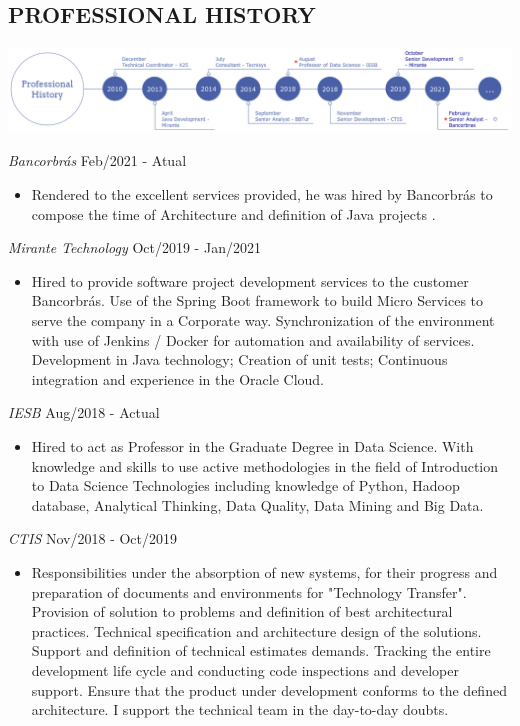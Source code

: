 \documentclass{res}
\begin{document}
\begin{resume}
		\section{PROFESSIONAL HISTORY} %
		\vspace{8pt}
		\includegraphics[width=1.0\textwidth]{imagens/experience}
		
		{\sl Bancorbrás} \hfill Feb/2021 - Atual
		\begin{itemize}
			\item Rendered to the excellent services provided, he was hired by Bancorbrás to compose the time of Architecture and definition of Java projects . 
		\end{itemize}
		
		{\sl Mirante Technology} \hfill Oct/2019 - Jan/2021
		\begin{itemize}
			\item Hired to provide software project development services to the customer Bancorbrás. Use of the Spring Boot framework to build Micro Services to serve the company in a Corporate way. Synchronization of the environment with use of Jenkins / Docker for automation and availability of services. Development in Java technology; Creation of unit tests; Continuous integration and experience in the Oracle Cloud. 
		\end{itemize}
		
		{\sl IESB} \hfill Aug/2018 - Actual
		\begin{itemize}
			\item Hired to act as Professor in the Graduate Degree in Data Science. With knowledge and skills to use active methodologies in the field of Introduction to Data Science Technologies including knowledge of Python, Hadoop database, Analytical Thinking, Data Quality, Data Mining and Big Data.
		\end{itemize}
		
		{\sl CTIS} \hfill Nov/2018 - Oct/2019
		\begin{itemize}
			\item Responsibilities under the absorption of new systems, for their progress and preparation of documents and environments for "Technology Transfer". Provision of solution to problems and definition of best architectural practices. Technical specification and architecture design of the solutions. Support and definition of technical estimates demands. Tracking the entire development life cycle and conducting code inspections and developer support. Ensure that the product under development conforms to the defined architecture. I support the technical team in the day-to-day doubts.
		\end{itemize}
		

\end{resume}
\end{document}
